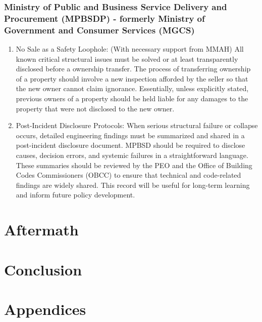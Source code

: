 \documentclass[12pt]{article}
\begin{document}
\subsubsection{Ministry of Public and Business Service Delivery and Procurement (MPBSDP) - formerly Ministry of Government and Consumer Services (MGCS)}
\begin{enumerate}
    \item No Sale as a Safety Loophole: (With necessary support from MMAH) All known critical structural issues must be solved or at least transparently disclosed before a ownership transfer. The process of transferring ownership of a property should involve a new inspection afforded by the seller so that the new owner cannot claim ignorance. Essentially, unless explicitly stated, previous owners of a property should be held liable for any damages to the property that were not disclosed to the new owner.

    \item Post-Incident Disclosure Protocols: When serious structural failure or collapse occurs, detailed engineering findings must be summarized and shared in a post-incident disclosure document. MPBSD should be required to disclose causes, decision errors, and systemic failures in a straightforward language. These summaries should be reviewed by the PEO and the Office of Building Codes Commissioners (OBCC) to ensure that technical and code-related findings are widely shared. This record will be useful for long-term learning and inform future policy development.

\end{enumerate}




\section{Aftermath}

\section{Conclusion}


\section*{Appendices}

\newpage
\printbibliography
\end{document}
